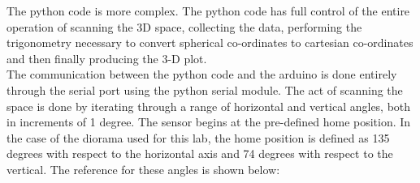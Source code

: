 \documentclass{article}
\begin{document}
The python code is more complex. The python code has full control of the entire operation of scanning the 3D space, collecting the data, performing the trigonometry necessary to convert spherical co-ordinates to cartesian co-ordinates and then finally producing the 3-D plot. \\

The communication between the python code and the arduino is done entirely through the serial port using the python serial module. The act of scanning the space is done by iterating through a range of horizontal and vertical angles, both in increments of 1 degree. The sensor begins at the pre-defined home position. In the case of the diorama used for this lab, the home position is defined as 135 degrees with respect to the horizontal axis and 74 degrees with respect to the vertical. The reference for these angles is shown below: \\
\end{document}
